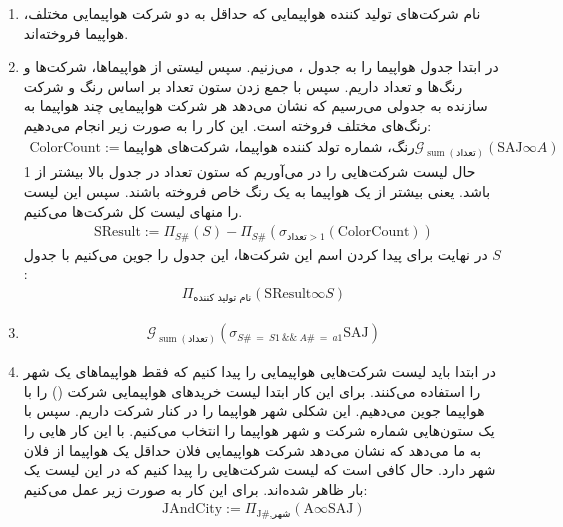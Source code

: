 \begin{enumerate}
    \item نام شرکت‌های تولید کننده هواپیمایی که حداقل به دو شرکت هواپیمایی مختلف، هواپیما فروخته‌اند.
    \item
    در ابتدا جدول هواپیما را به جدول
    ، 
    می‌زنیم. سپس لیستی از هواپیما‌ها، شرکت‌ها و رنگ‌ها و تعداد داریم. سپس با جمع زدن ستون تعداد بر اساس رنگ و شرکت سازنده
    به جدولی می‌رسیم که نشان می‌دهد هر شرکت هواپیمایی چند هواپیما به رنگ‌های مختلف فروخته است. این کار را به صورت زیر
    انجام می‌دهیم:
    \begin{gather*}
        \text{ColorCount} := \text{رنگ، شماره تولد کننده هواپیما، شرکت‌های هواپیما}\mathcal{G}_{\operatorname{sum}(\text{تعداد})}(\text{SAJ} \infty A)
    \end{gather*}
    حال لیست شرکت‌هایی را در می‌آوریم که ستون تعداد در جدول بالا بیشتر از 1 باشد. یعنی بیشتر از یک هواپیما به
    یک رنگ خاص فروخته باشند. سپس این لیست را منهای لیست کل شرکت‌ها می‌کنیم.
    \begin{gather*}
        \text{SResult} := \Pi_{S\#} (S) - \Pi_{S\#}(\sigma_{\text{تعداد} > 1}(\text{ColorCount}))
    \end{gather*}
    در نهایت برای پیدا کردن اسم این شرکت‌ها، این جدول را جوین می‌کنیم با جدول
    $S$:
    \begin{gather*}
        \Pi_{\text{نام تولید کننده}} (\text{SResult} \infty S)
    \end{gather*}
    \item
    \begin{gather*}
        \mathcal{G}_{\operatorname{sum}(\text{تعداد})}(\sigma_{S\# ~ = ~S1 ~ \&\& ~ A\#~=~a1} \text{SAJ})
    \end{gather*}
    \item در ابتدا باید لیست شرکت‌هایی هواپیمایی را پیدا کنیم که فقط هواپیماهای یک شهر را استفاده می‌کنند.
    برای این کار ابتدا لیست خرید‌های هواپیمایی شرکت
    ()
    را با هواپیما جوین می‌دهیم. این شکلی شهر هواپیما را در کنار شرکت داریم. سپس با یک
    ستون‌هایی شماره شرکت و شهر هواپیما را انتخاب می‌کنیم. با این کار
    هایی
    را به ما می‌دهد که نشان می‌دهد شرکت هواپیمایی فلان حداقل یک هواپیما از فلان شهر دارد.
    حال کافی است که لیست شرکت‌هایی را پیدا کنیم که در این لیست یک بار ظاهر شده‌اند.
    برای این کار به صورت زیر عمل می‌کنیم:
    \begin{gather*}
        \text{JAndCity} := \Pi_{\text{J\#}, \text{شهر}} (\text{A} \infty \text{SAJ})\\

\end{gather*}
\end{enumerate}
